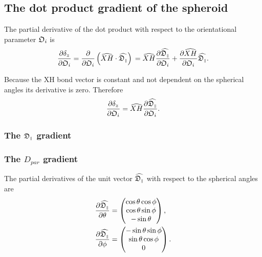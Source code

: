 
\subsection{The dot product gradient of the spheroid}

The partial derivative of the dot product with respect to the orientational parameter $\mathfrak{O}_i$ is
\begin{equation}
    \frac{\partial \delta_z}{\partial \mathfrak{O}_i}
        = \frac{\partial}{\partial \mathfrak{O}_i} \left( \widehat{XH} \cdot \widehat{\mathfrak{D}_{\scriptscriptstyle \parallel}} \right) \\
        = \widehat{XH} \frac{\partial \widehat{\mathfrak{D}_{\scriptscriptstyle \parallel}}}{\partial \mathfrak{O}_i}  +  \frac{\partial \widehat{XH}}{\partial \mathfrak{O}_i} \widehat{\mathfrak{D}_{\scriptscriptstyle \parallel}}.
\end{equation}

\noindent Because the XH bond vector is constant and not dependent on the spherical angles its derivative is zero.  Therefore
\begin{equation}
    \frac{\partial \delta_z}{\partial \mathfrak{O}_i} = \widehat{XH} \frac{\partial \widehat{\mathfrak{D}_{\scriptscriptstyle \parallel}}}{\partial \mathfrak{O}_i}.
\end{equation}



\begin{latexonly}
    \subsubsection{The $\mathfrak{D}_{\scriptscriptstyle \parallel}$ gradient}
\end{latexonly}
\begin{htmlonly}
    \subsubsection{The $D_{par}$ gradient}
\end{htmlonly}

The partial derivatives of the unit vector $\widehat{\mathfrak{D}_{\scriptscriptstyle \parallel}}$ with respect to the spherical angles are
\begin{subequations}
\begin{align}
    \frac{\partial \widehat{\mathfrak{D}_{\scriptscriptstyle \parallel}}}{\partial \theta} &= \begin{pmatrix}
        \cos \theta \cos \phi \\
        \cos \theta \sin \phi \\
        -\sin \theta \\
    \end{pmatrix}, \\
    \frac{\partial \widehat{\mathfrak{D}_{\scriptscriptstyle \parallel}}}{\partial \phi} &= \begin{pmatrix}
        -\sin \theta \sin \phi \\
        \sin \theta \cos \phi \\
        0 \\
    \end{pmatrix}.
\end{align}
\end{subequations}



